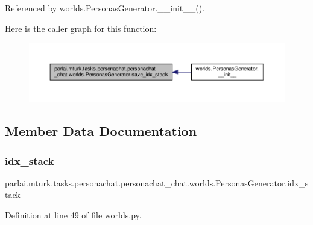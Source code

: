 Referenced by worlds.\+Personas\+Generator.\+\_\+\+\_\+init\+\_\+\+\_\+().

Here is the caller graph for this function\+:
\nopagebreak
\begin{figure}[H]
\begin{center}
\leavevmode
\includegraphics[width=350pt]{classparlai_1_1mturk_1_1tasks_1_1personachat_1_1personachat__chat_1_1worlds_1_1PersonasGenerator_a49c91f6d43cf77f815700b6837f0400d_icgraph}
\end{center}
\end{figure}


\subsection{Member Data Documentation}
\mbox{\label{classparlai_1_1mturk_1_1tasks_1_1personachat_1_1personachat__chat_1_1worlds_1_1PersonasGenerator_a608c0f26f6e8ca388ce2e336068fae51}} 
\subsubsection{\texorpdfstring{idx\+\_\+stack}{idx\_stack}}
{\footnotesize\ttfamily parlai.\+mturk.\+tasks.\+personachat.\+personachat\+\_\+chat.\+worlds.\+Personas\+Generator.\+idx\+\_\+stack}



Definition at line 49 of file worlds.\+py.



